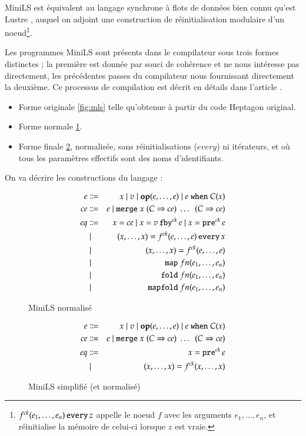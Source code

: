 \documentclass[9pt,a4paper]{article}
\newcommand{\LANG}{Heptagon}
\newcommand{\p}[0]{\; \vert \;}
\newcommand{\mybox}[1]{\mbox{\tt{#1}}}
\newcommand{\Op}[2]{\mybox{\bf{op}}(#1,\dots,#2)}
\newcommand{\Fby}[2]{#1 \, \mybox{fby}^{ck} \, #2}
\newcommand{\Pre}[1]{\mybox{pre}^{ck} \, #1}
\newcommand{\Every}[4]{#1^{ck}(#2,\dots,#3) \, \mybox{every} \, #4}
\newcommand{\App}[2]{#1^{ck}(#2)}
\newcommand{\When}[3]{#1 \; \mybox{when} \; #2(#3)}
\newcommand{\Merge}[5]{\mybox{merge} \; #1 \; (#2 \Rightarrow #3) \; \dots \; \
  (#4 \Rightarrow #5)}
\newcommand{\Map}[3]{\mathtt{map} \; #1 n (#2,\dots,#3)}
\newcommand{\Fold}[3]{\mathtt{fold} \; #1 n (#2,\dots,#3)}
\newcommand{\Mapfold}[3]{\mathtt{mapfold} \; #1 n (#2,\dots,#3)}
\begin{document}
MiniLS est équivalent au langage synchrone à flots de données bien connu qu'est
Lustre \cite{lustre}, auquel on adjoint une construction de réinitialisation
modulaire d'un noeud\footnote{$\Every{f}{e_1}{e_n}{z}$ appelle le noeud $f$ avec
  les arguments $e_1,\dots,e_n$, et réinitialise la mémoire de celui-ci lorsque
  $z$ est vraie.}.

Les programmes MiniLS sont présents dans le compilateur sous trois formes
distinctes ; la première est donnée par souci de cohérence et ne nous intéresse
pas directement, les précédentes passes du compilateur nous fournissant
directement la deuxième. Ce processus de compilation est décrit en détails dans
l'article \cite{lctes08a}.

\begin{itemize}
\item Forme originale \ref{fig:mls} telle qu'obtenue à partir du code \LANG{}
  original.
\item Forme normale \ref{fig:mlsn}.
\item Forme finale \ref{fig:mlsns}, normalisée, sans réinitialisations ($every$)
  ni itérateurs, et où tous les paramètres effectifs sont des noms
  d'identifiants.
\end{itemize}

On va décrire les constructions du langage :

\begin{figure}[htp]
  \centering
  \begin{eqnarray*}
    e & \Coloneqq & x \p v \p \Op{e}{e} \p \When{e}{C}{x} \\
    ce & \Coloneqq & e \p \Merge{x}{C}{ce}{C}{ce} \\
    eq & \Coloneqq & x = ce \p x = \Fby{v}{e} \p x = \Pre{e} \\
    & \p & (x,\dots,x) = \Every{f}{e}{e}{x} \\
    & \p & (x,\dots,x) = \App{f}{e,\dots,e} \\
    & \p & \Map{f}{e_1}{e_n} \\
    & \p & \Fold{f}{e_1}{e_n} \\
    & \p & \Mapfold{f}{e_1}{e_n}
  \end{eqnarray*}
  \caption{MiniLS normalisé}
  \label{fig:mlsn}
\end{figure}

\begin{figure}[htp]
  \centering
  \begin{eqnarray*}
    e & \Coloneqq & x \p v \p \Op{e}{e} \p \When{e}{C}{x} \\
    ce & \Coloneqq & e \p \Merge{x}{C}{ce}{C}{ce} \\
    eq & \Coloneqq & x = \Pre{e} \\
    & \p & (x,\dots,x) = \App{f}{x,\dots,x}
  \end{eqnarray*}
  \caption{MiniLS simplifié (et normalisé)}
  \label{fig:mlsns}
\end{figure}
\end{document}
